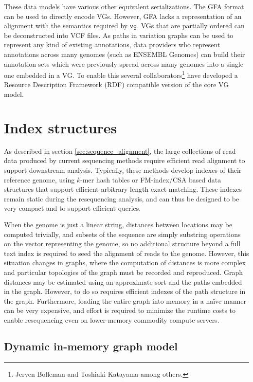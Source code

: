 \documentclass[a4paper,12pt,numbered,oneside]{Classes/PhDThesisPSnPDF}
\begin{document}
These data models have various other equivalent serializations.
The GFA format can be used to directly encode VGs.
However, GFA lacks a representation of an alignment with the semantics required by {\tt vg}.
VGs that are partially ordered can be deconstructed into VCF files.
As paths in variation graphs can be used to represent any kind of existing annotations, data providers who represent annotations across many genomes (such as ENSEMBL Genomes) can build their annotation sets which were previously spread across many genomes into a single one embedded in a VG.
To enable this several collaborators\footnote{Jerven Bolleman and Toshiaki Katayama among others.} have developed a Resource Description Framework (RDF) compatible version of the core VG model.

\section{Index structures}
\label{sec:index_structures}

As described in section \ref{sec:sequence_alignment}, the large collections of read data produced by current sequencing methods require efficient read alignment to support downstream analysis.
Typically, these methods develop indexes of their reference genome, using $k$-mer hash tables or FM-index/CSA based data structures that support efficient arbitrary-length exact matching.
These indexes remain static during the resequencing analysis, and can thus be designed to be very compact and to support efficient queries.

When the genome is just a linear string, distances between locations may be computed trivially, and subsets of the sequence are simply substring operations on the vector representing the genome, so no additional structure beyond a full text index is required to seed the alignment of reads to the genome.
However, this situation changes in graphs, where the computation of distances is more complex and particular topologies of the graph must be recorded and reproduced.
Graph distances may be estimated using an approximate sort and the paths embedded in the graph.
However, to do so requires efficient indexes of the path structure in the graph.
Furthermore, loading the entire graph into memory in a na\"{i}ve manner can be very expensive, and effort is required to minimize the runtime costs to enable resequencing even on lower-memory commodity compute servers.

\subsection{Dynamic in-memory graph model}
\end{document}
